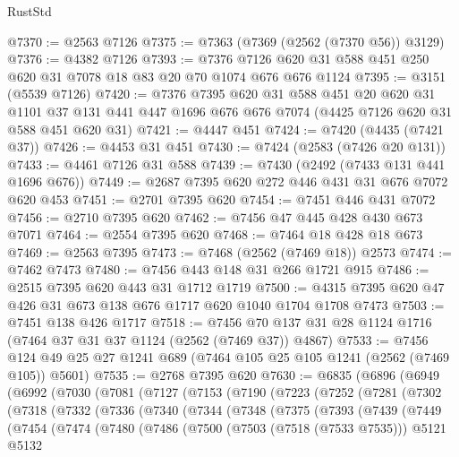 \begin{lexlean}{RustStd}
\begin{coremodule}
{\begin{coremodule}
{{{{{{{{{{{{{{{@7370 := @2563 @7126
@7375 := @7363 (@7369 (@2562 (@7370 @56)) @3129)
@7376 := @4382 @7126
@7393 := @7376 @7126 @620 @31 @588 @451 @250 @620 @31 @7078 @18 @83 @20 @70 @1074 @676 @676 @1124
@7395 := @3151 (@5539 @7126)
@7420 := @7376
    @7395
    @620
    @31
    @588
    @451
    @20
    @620
    @31
    @1101
    @37
    @131
    @441
    @447
    @1696
    @676
    @676
    @7074
    (@4425 @7126 @620 @31 @588 @451 @620 @31)
@7421 := @4447 @451
@7424 := @7420 (@4435 (@7421 @37))
@7426 := @4453 @31 @451
@7430 := @7424 (@2583 (@7426 @20 @131))
@7433 := @4461 @7126 @31 @588
@7439 := @7430 (@2492 (@7433 @131 @441 @1696 @676))
@7449 := @2687 @7395 @620 @272 @446 @431 @31 @676 @7072 @620 @453
@7451 := @2701 @7395 @620
@7454 := @7451 @446 @431 @7072
@7456 := @2710 @7395 @620
@7462 := @7456 @47 @445 @428 @430 @673 @7071
@7464 := @2554 @7395 @620
@7468 := @7464 @18 @428 @18 @673
@7469 := @2563 @7395
@7473 := @7468 (@2562 (@7469 @18)) @2573
@7474 := @7462 @7473
@7480 := @7456 @443 @148 @31 @266 @1721 @915
@7486 := @2515 @7395 @620 @443 @31 @1712 @1719
@7500 := @4315 @7395 @620 @47 @426 @31 @673 @138 @676 @1717 @620 @1040 @1704 @1708 @7473
@7503 := @7451 @138 @426 @1717
@7518 := @7456 @70 @137 @31 @28 @1124 @1716 (@7464 @37 @31 @37 @1124 (@2562 (@7469 @37)) @4867)
@7533 := @7456 @124 @49 @25 @27 @1241 @689 (@7464 @105 @25 @105 @1241 (@2562 (@7469 @105)) @5601)
@7535 := @2768 @7395 @620
@7630 := @6835
    (@6896
      (@6949
        (@6992
          (@7030
            (@7081
              (@7127
                (@7153
                  (@7190
                    (@7223
                      (@7252
                        (@7281
                          (@7302
                            (@7318
                              (@7332
                                (@7336
                                  (@7340
                                    (@7344
                                      (@7348
                                        (@7375
                                          (@7393
                                            (@7439
                                              (@7449
                                                (@7454
                                                  (@7474
                                                    (@7480
                                                      (@7486
                                                        (@7500
                                                          (@7503 (@7518 (@7533 @7535)))
                                                          @5121
                                                          @5132
}}}}}}}}}}}}}}}
\end{coremodule}}
\end{coremodule}
\end{lexlean}
